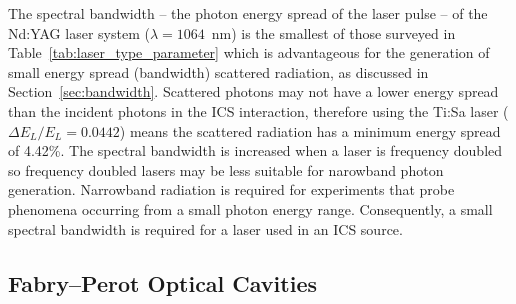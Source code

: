 \documentclass[../main.tex]{subfiles}
\begin{document}
The spectral bandwidth -- the photon energy spread of the laser pulse -- of the Nd:YAG laser system ($\lambda = 1064$~\si{\nano\meter}) is the smallest of those surveyed in Table~\ref{tab:laser_type_parameter} which is advantageous for the generation of small energy spread (bandwidth) scattered radiation, as discussed in Section~\ref{sec:bandwidth}. Scattered photons may not have a lower energy spread than the incident photons in the ICS interaction, therefore using the Ti:Sa laser ($\Delta E_{L}/E_{L} = 0.0442$) means the scattered radiation has a minimum energy spread of 4.42\%. The spectral bandwidth is increased when a laser is frequency doubled so frequency doubled lasers may be less suitable for narowband photon generation. Narrowband radiation is required for experiments that probe phenomena occurring from a small photon energy range. Consequently, a small spectral bandwidth is required for a laser used in an ICS source.   

\subsection{Fabry--Perot Optical Cavities}
\label{sec:fabry_perot_optical_cavities}
\end{document}
